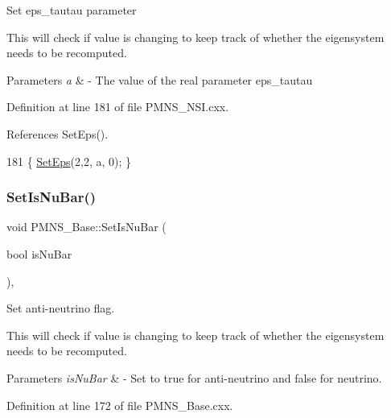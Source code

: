 Set eps\+\_\+tautau parameter

This will check if value is changing to keep track of whether the eigensystem needs to be recomputed.


\begin{DoxyParams}{Parameters}
{\em a} & -\/ The value of the real parameter eps\+\_\+tautau \\
\hline
\end{DoxyParams}


Definition at line 181 of file P\+M\+N\+S\+\_\+\+N\+S\+I.\+cxx.



References Set\+Eps().


\begin{DoxyCode}
181 \{ \hyperlink{classOscProb_1_1PMNS__NSI_a87c508149ea36b6de493a6817247a0ea}{SetEps}(2,2, a, 0); \}
\end{DoxyCode}
\mbox{\label{classOscProb_1_1PMNS__Base_a717e0348cf762f3961854e332a9b52e0}} 
\subsubsection{\texorpdfstring{Set\+Is\+Nu\+Bar()}{SetIsNuBar()}}
{\footnotesize\ttfamily void P\+M\+N\+S\+\_\+\+Base\+::\+Set\+Is\+Nu\+Bar (\begin{DoxyParamCaption}\item[{bool}]{is\+Nu\+Bar }\end{DoxyParamCaption})\hspace{0.3cm}{\ttfamily [virtual]}, {\ttfamily [inherited]}}

Set anti-\/neutrino flag.

This will check if value is changing to keep track of whether the eigensystem needs to be recomputed.


\begin{DoxyParams}{Parameters}
{\em is\+Nu\+Bar} & -\/ Set to true for anti-\/neutrino and false for neutrino. \\
\hline
\end{DoxyParams}


Definition at line 172 of file P\+M\+N\+S\+\_\+\+Base.\+cxx.



